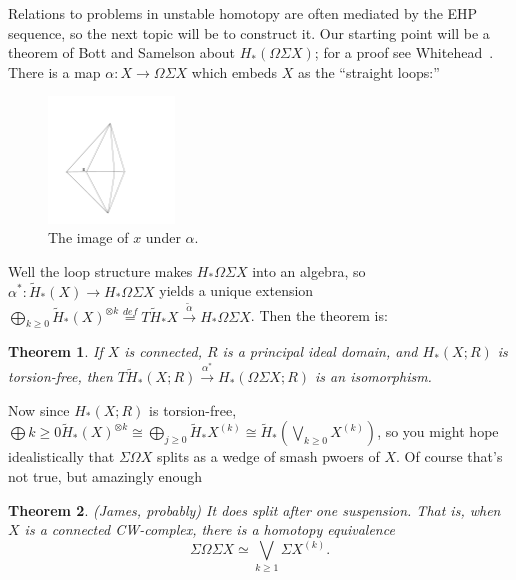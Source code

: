 \documentclass{article}
\newcommand{\Suspend}{\Sigma}
\newcommand{\Loops}{\Omega}
\newtheorem{thm}{Theorem}[section]
\begin{document}
Relations to problems in unstable homotopy are often mediated by the EHP sequence, so the next topic will be to construct it.  Our starting point will be a theorem of Bott and Samelson about $H_*(\Loops \Suspend X)$; for a proof see Whitehead~\cite{Whitehead}.  There is a map $\alpha: X \to \Loops \Suspend X$ which embeds $X$ as the ``straight loops:''
\begin{figure}[h!]
\centering\includegraphics[width=0.3\textwidth]{figures/17.pdf}
\caption{\small The image of $x$ under $\alpha$.}
\end{figure}
Well the loop structure makes $H_* \Loops \Suspend X$ into an algebra, so $\alpha^*: \tilde H_*(X) \to H_* \Loops \Suspend X$ yields a unique extension $\bigoplus_{k \ge 0} \tilde H_*(X)^{\otimes k} \stackrel{def}{=} T \tilde H_* X \stackrel{\tilde \alpha}{\to} H_* \Loops \Suspend X$.  Then the theorem is:
\begin{thm}
If $X$ is connected, $R$ is a principal ideal domain, and $H_*(X; R)$ is torsion-free, then $T \tilde H_*(X; R) \stackrel{\alpha^*}{\to} H_*(\Loops \Suspend X; R)$ is an isomorphism.
\end{thm}
Now since $H_*(X; R)$ is torsion-free, $\bigoplus{k \ge 0} \tilde H_*(X)^{\otimes k} \cong \bigoplus_{j \ge 0} \tilde H_* X^{(k)} \cong \tilde H_*(\bigvee_{k \ge 0} X^{(k)})$, so you might hope idealistically that $\Suspend \Loops X$ splits as a wedge of smash pwoers of $X$.  Of course that's not true, but amazingly enough
\begin{thm}(James, probably)
It \emph{does} split after one suspension.  That is, when $X$ is a connected CW-complex, there is a homotopy equivalence
\[
\Suspend \Loops \Suspend X \simeq \bigvee_{k \ge 1} \Suspend X^{(k)}
.\]
\end{thm}
\end{document}
